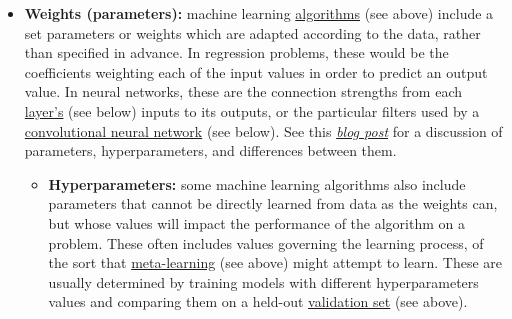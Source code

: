 \begin{itemize}
\item \textbf{Weights (parameters):\label{tg:weights}} machine learning \hyperref[tg:algorithm]{algorithms} (see above) include a set parameters or weights which are adapted according to the data, rather than specified in advance. In regression problems, these would be the coefficients weighting each of the input values in order to predict an output value. In neural networks, these are the connection strengths from each \hyperref[tg:layer]{layer's} (see below) inputs to its outputs, or the particular filters used by a \hyperref[tg:cnn]{convolutional neural network} (see below). See this \href{https://machinelearningmastery.com/difference-between-a-parameter-and-a-hyperparameter/}{\emph{blog post}} for a discussion of parameters, hyperparameters, and differences between them.

  \begin{itemize}
  \item \textbf{Hyperparameters:\label{tg:hyperparameters}} some machine learning algorithms also include parameters that cannot be directly learned from data as the weights can, but whose values will impact the performance of the algorithm on a problem. These often includes values governing the learning process, of the sort that \hyperref[tg:meta-learning]{meta-learning} (see above) might attempt to learn. These are usually determined by training models with different hyperparameters values and comparing them on a held-out \hyperref[tg:validation]{validation set} (see above).
  \end{itemize}
\end{itemize}